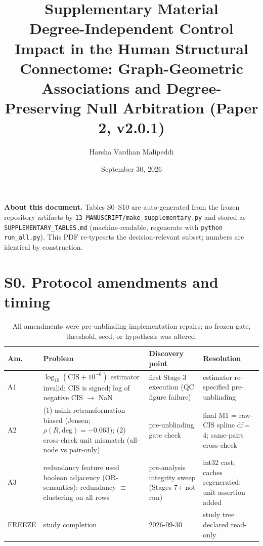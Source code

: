 \documentclass[11pt,a4paper]{article}
\title{\textbf{Supplementary Material}\\[4pt]
\large Degree-Independent Control Impact in the Human Structural
Connectome: Graph-Geometric Associations and Degree-Preserving Null
Arbitration (Paper 2, v2.0.1)}
\author{Harsha Vardhan Malipeddi}
\date{September 30, 2026}
\begin{document}
\maketitle

\noindent
\textbf{About this document.} Tables S0--S10 are auto-generated from the
frozen repository artifacts by
\texttt{13\_MANUSCRIPT/make\_supplementary.py} and stored as
\texttt{SUPPLEMENTARY\_TABLES.md} (machine-readable, regenerate with
\texttt{python run\_all.py}). This PDF re-typesets the
decision-relevant subset; numbers are identical by construction.

\section{S0. Protocol amendments and timing}
\begin{table}[h]\centering\small
\caption{All amendments were pre-unblinding implementation repairs; no
frozen gate, threshold, seed, or hypothesis was altered.}
\begin{tabular}{p{1.2cm}p{5.2cm}p{3.4cm}p{3.6cm}}
\toprule
Am. & Problem & Discovery point & Resolution \\
\midrule
A1 & $\log_{10}(\mathrm{CIS}+10^{-6})$ estimator invalid: CIS is signed; log of negative CIS $\to$ NaN & first Stage-3 execution (QC figure failure) & estimator re-specified pre-unblinding \\
A2 & (1) asinh retransformation biased (Jensen; $\rho(R,\mathrm{deg})=-0.063$); (2) cross-check unit mismatch (all-node vs pair-only) & pre-unblinding gate check & final M1 = raw-CIS spline df\,=\,4; same-pairs cross-check \\
A3 & redundancy feature used boolean adjacency (OR-semantics): redundancy $\equiv$ clustering on all rows & pre-analysis integrity sweep (Stages 7+ not run) & int32 cast; caches regenerated; unit assertion added \\
FREEZE & study completion & 2026-09-30 & study tree declared read-only \\
\bottomrule
\end{tabular}
\end{table}
\end{document}

